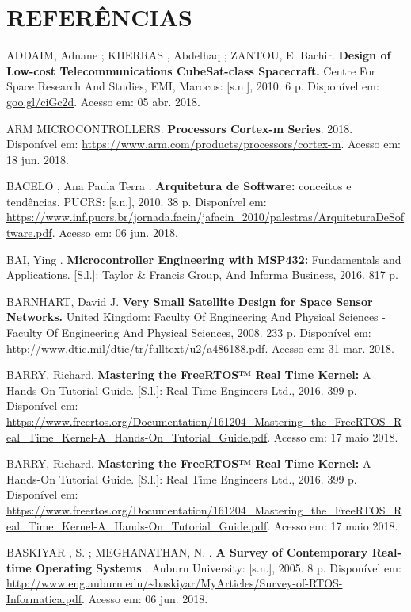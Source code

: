 \chapter[REFERÊNCIAS]{REFERÊNCIAS}

\noindent ADDAIM, Adnane ; KHERRAS , Abdelhaq ; ZANTOU, El Bachir. \textbf{Design of Low-cost Telecommunications CubeSat-class Spacecraft. } Centre For Space Research And Studies, EMI, Marocos: [s.n.], 2010. 6 p. Disponível em: \url{goo.gl/ciGc2d}. Acesso em: 05 abr. 2018.

\noindent ARM MICROCONTROLLERS. \textbf{Processors Cortex-m Series}. 2018. Disponível em: \url{https://www.arm.com/products/processors/cortex-m}. Acesso em: 18 jun. 2018.

\noindent BACELO , Ana Paula Terra . \textbf{Arquitetura de Software:} conceitos e tendências. PUCRS: [s.n.], 2010. 38 p. Disponível em: \url{https://www.inf.pucrs.br/jornada.facin/jafacin_2010/palestras/ArquiteturaDeSoftware.pdf}. Acesso em: 06 jun. 2018.

\noindent BAI, Ying . \textbf{Microcontroller Engineering with MSP432:} Fundamentals and Applications. [S.l.]: Taylor \& Francis Group, And Informa Business, 2016. 817 p.

\noindent BARNHART, David J. \textbf{Very Small Satellite Design for Space Sensor Networks. } United Kingdom: Faculty Of Engineering And Physical Sciences - Faculty Of Engineering And Physical Sciences, 2008. 233 p. Disponível em: \url{http://www.dtic.mil/dtic/tr/fulltext/u2/a486188.pdf}. Acesso em: 31 mar. 2018.

\noindent BARRY, Richard. \textbf{Mastering the FreeRTOS™ Real Time Kernel:} A Hands-On Tutorial Guide. [S.l.]: Real Time Engineers Ltd., 2016. 399 p. Disponível em: \url{https://www.freertos.org/Documentation/161204_Mastering_the_FreeRTOS_Real_Time_Kernel-A_Hands-On_Tutorial_Guide.pdf}. Acesso em: 17 maio 2018.

\noindent BARRY, Richard. \textbf{Mastering the FreeRTOS™ Real Time Kernel:} A Hands-On Tutorial Guide. [S.l.]: Real Time Engineers Ltd., 2016. 399 p. Disponível em: \url{https://www.freertos.org/Documentation/161204_Mastering_the_FreeRTOS_Real_Time_Kernel-A_Hands-On_Tutorial_Guide.pdf}. Acesso em: 17 maio 2018.

\noindent BASKIYAR , S. ; MEGHANATHAN, N. . \textbf{A Survey of Contemporary Real-time Operating Systems} . Auburn University: [s.n.], 2005. 8 p. Disponível em: \url{http://www.eng.auburn.edu/~baskiyar/MyArticles/Survey-of-RTOS-Informatica.pdf}. Acesso em: 06 jun. 2018.

